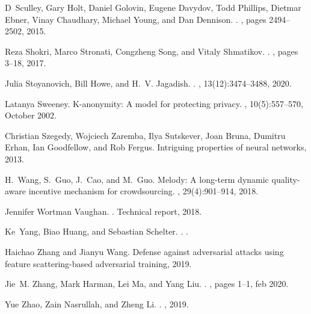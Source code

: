 \documentclass[11pt]{article}
\begin{document}
\begin{thebibliography}{10}
D~Sculley, Gary Holt, Daniel Golovin, Eugene Davydov, Todd Phillips, Dietmar
  Ebner, Vinay Chaudhary, Michael Young, and Dan Dennison.
.
, pages 2494--2502, 2015.

Reza Shokri, Marco Stronati, Congzheng Song, and Vitaly Shmatikov.
.
, pages
  3--18, 2017.

Julia Stoyanovich, Bill Howe, and H.~V. Jagadish.
.
, 13(12):3474--3488, 2020.

Latanya Sweeney.
\newblock K-anonymity: A model for protecting privacy.
,
  10(5):557--570, October 2002.

Christian Szegedy, Wojciech Zaremba, Ilya Sutskever, Joan Bruna, Dumitru Erhan,
  Ian Goodfellow, and Rob Fergus.
\newblock Intriguing properties of neural networks, 2013.

H.~{Wang}, S.~{Guo}, J.~{Cao}, and M.~{Guo}.
\newblock Melody: A long-term dynamic quality-aware incentive mechanism for
  crowdsourcing.
,
  29(4):901--914, 2018.

Jennifer {Wortman Vaughan}.
.
\newblock Technical report, 2018.

Ke~Yang, Biao Huang, and Sebastian Schelter.
.
.

Haichao Zhang and Jianyu Wang.
\newblock Defense against adversarial attacks using feature scattering-based
  adversarial training, 2019.

Jie~M. Zhang, Mark Harman, Lei Ma, and Yang Liu.
.
, pages 1--1, feb
  2020.

Yue Zhao, Zain Nasrullah, and Zheng Li.
.
, 2019.


\end{thebibliography}
\end{document}
